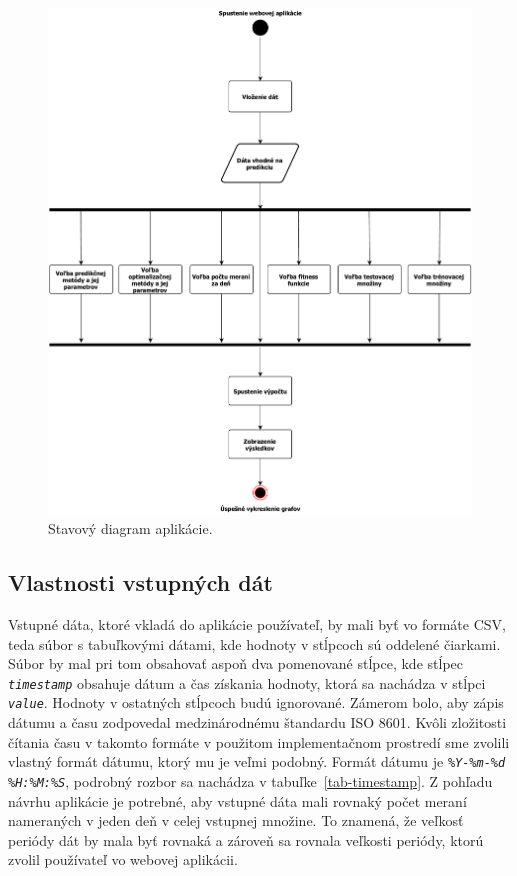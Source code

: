 \documentclass[a4paper,slovak,12pt,appendix]{article}
\begin{document}
\begin{figure}[!ht]
  \centering
  \includegraphics[width=\textwidth]{state_diagram.pdf}
  \caption{Stavový diagram aplikácie.}
  \label{fig-state-diag}
\end{figure}


\subsection{Vlastnosti vstupných dát}
Vstupné dáta, ktoré vkladá do aplikácie používateľ, by mali byť vo formáte CSV,
teda súbor s tabuľkovými dátami, kde hodnoty v stĺpcoch sú oddelené čiarkami.
Súbor by mal pri tom obsahovať aspoň dva pomenované stĺpce, kde stĺpec \texttt{\textit{timestamp}}
obsahuje dátum a čas získania hodnoty, ktorá sa nachádza v stĺpci \texttt{\textit{value}}.
Hodnoty v ostatných stĺpcoch budú ignorované.
Zámerom bolo, aby zápis dátumu a času zodpovedal medzinárodnému štandardu
ISO 8601. Kvôli zložitosti čítania času v takomto formáte v použitom
implementačnom prostredí sme zvolili vlastný formát dátumu, ktorý mu je veľmi
podobný. Formát dátumu je \texttt{\textit{\%Y-\%m-\%d \%H:\%M:\%S}}, podrobný rozbor sa
nachádza v tabuľke~\ref{tab-timestamp}. Z pohľadu návrhu aplikácie je potrebné,
aby vstupné dáta mali rovnaký počet meraní nameraných v jeden deň v celej
vstupnej množine. To znamená, že veľkosť periódy dát by mala byť rovnaká
a zároveň sa rovnala veľkosti periódy, ktorú zvolil používateľ vo webovej
aplikácii.
\end{document}
